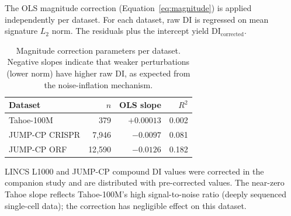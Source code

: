 \documentclass[11pt]{article}
\begin{document}
The OLS magnitude correction (Equation~\ref{eq:magnitude}) is applied
independently per dataset.  For each dataset, raw DI is regressed on
mean signature $L_2$ norm.  The residuals plus the intercept yield
$\mathrm{DI}_{\mathrm{corrected}}$.

\vspace{1em}
\begin{table}[h]
\centering
\caption{Magnitude correction parameters per dataset.  Negative slopes
indicate that weaker perturbations (lower norm) have higher raw DI, as
expected from the noise-inflation mechanism.}
\label{tab:magcorr}
\small
\begin{tabular}{lrrr}
\toprule
Dataset & $n$ & OLS slope & $R^2$ \\
\midrule
Tahoe-100M & 379 & $+0.00013$ & 0.002 \\
JUMP-CP CRISPR & 7{,}946 & $-0.0097$ & 0.081 \\
JUMP-CP ORF & 12{,}590 & $-0.0126$ & 0.182 \\
\bottomrule
\end{tabular}
\end{table}

LINCS L1000 and JUMP-CP compound DI values were corrected in the
companion study \citep{tower2026confound} and are distributed with
pre-corrected values.  The near-zero Tahoe slope reflects Tahoe-100M's
high signal-to-noise ratio (deeply sequenced single-cell data); the
correction has negligible effect on this dataset.
\end{document}
